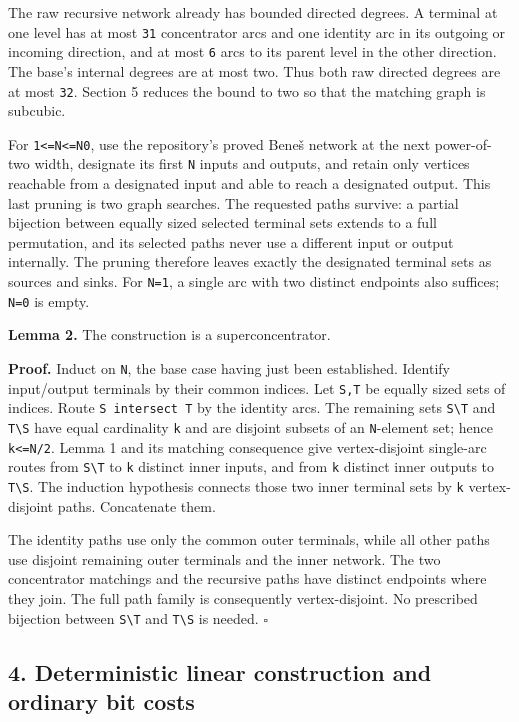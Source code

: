 The raw recursive network already has bounded directed degrees. A terminal at one level has at most \texttt{31} concentrator arcs and one identity arc in its outgoing or incoming direction, and at most \texttt{6} arcs to its parent level in the other direction. The base's internal degrees are at most two. Thus both raw directed degrees are at most \texttt{32}. Section 5 reduces the bound to two so that the matching graph is subcubic.

For \texttt{1\textless{}=N\textless{}=N0}, use the repository's proved Beneš network at the next power-of-two width, designate its first \texttt{N} inputs and outputs, and retain only vertices reachable from a designated input and able to reach a designated output. This last pruning is two graph searches. The requested paths survive: a partial bijection between equally sized selected terminal sets extends to a full permutation, and its selected paths never use a different input or output internally. The pruning therefore leaves exactly the designated terminal sets as sources and sinks. For \texttt{N=1}, a single arc with two distinct endpoints also suffices; \texttt{N=0} is empty.

\textbf{Lemma 2.} The construction is a superconcentrator.

\textbf{Proof.} Induct on \texttt{N}, the base case having just been established. Identify input/output terminals by their common indices. Let \texttt{S,T} be equally sized sets of indices. Route \texttt{S\ intersect\ T} by the identity arcs. The remaining sets \texttt{S\textbackslash{}T} and \texttt{T\textbackslash{}S} have equal cardinality \texttt{k} and are disjoint subsets of an \texttt{N}-element set; hence \texttt{k\textless{}=N/2}. Lemma 1 and its matching consequence give vertex-disjoint single-arc routes from \texttt{S\textbackslash{}T} to \texttt{k} distinct inner inputs, and from \texttt{k} distinct inner outputs to \texttt{T\textbackslash{}S}. The induction hypothesis connects those two inner terminal sets by \texttt{k} vertex-disjoint paths. Concatenate them.

The identity paths use only the common outer terminals, while all other paths use disjoint remaining outer terminals and the inner network. The two concentrator matchings and the recursive paths have distinct endpoints where they join. The full path family is consequently vertex-disjoint. No prescribed bijection between \texttt{S\textbackslash{}T} and \texttt{T\textbackslash{}S} is needed. \hfill\(\square\)

\hypertarget{af-a1dc8f9b11-deterministic-linear-construction-and-ordinary-bit-costs}{%
\subsection{4. Deterministic linear construction and ordinary bit costs}\label{af-a1dc8f9b11-deterministic-linear-construction-and-ordinary-bit-costs}}

